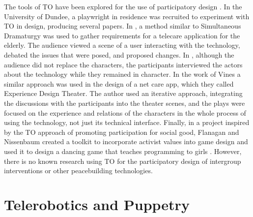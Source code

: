 \documentclass[dissertation,math,vertlayout,pdfa,colorlinks]{aaltoseries}
\begin{document}
The tools of TO have been explored for the use of participatory design \cite{macchiaExploringTheaterOppressed2016}. In the University of Dundee, a playwright in residence was recruited to experiment with TO in design, producing several papers. In \cite{morganRequirementsGatheringDiverse2008}, a method similar to Simultaneous Dramaturgy was used to gather requirements for a telecare application for the elderly. The audience viewed a scene of a user interacting with the technology, debated the issues that were posed, and proposed changes. In \cite{riceForumTheatreRequirements2007,newellUseTheatreRequirements2006}, although the audience did not replace the characters, the participants interviewed the actors about the technology while they remained in character. In the work of Vines \cite{vinesExperienceDesignTheatre2014, vinesPlayingProvocations2018} a similar approach was used in the design of a net care app, which they called Experience Design Theater. The author used an iterative approach, integrating the discussions with the participants into the theater scenes, and the plays were focused on the experience and relations of the characters in the whole process of using the technology, not just its technical interface. Finally, in a project inspired by the TO approach of promoting participation for social good, Flanagan and Nissenbaum created a toolkit to incorporate activist values into game design and used it to design a dancing game that teaches programming to girls \cite{flanaganGameDesignMethodology2007}. However, there is no known research using TO for the participatory design of intergroup interventions or other peacebuilding technologies. 

\section{Telerobotics and Puppetry}
\end{document}
